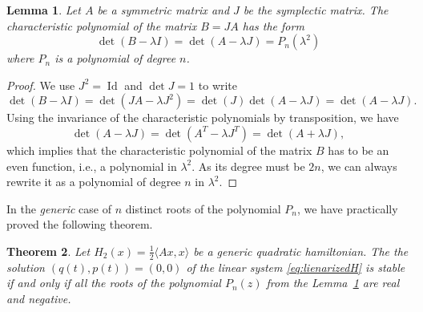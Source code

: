 \documentclass[english,fontsize=11pt,paper=b5]{scrbook}
\DeclareMathOperator{\Id}{Id}
\DeclareMathOperator{\Id}{Id}
\newtheorem{theorem}{Theorem}[chapter]
\newtheorem{lemma}[theorem]{Lemma}
\theoremstyle{definition}
\begin{document}
      \begin{lemma}\label{eq:lemmaCP}
        Let $A$ be a symmetric matrix and $J$ be the symplectic matrix.
        The characteristic polynomial of the matrix $B=JA$ has the form
        \begin{equation}
          \det(B-\lambda I) = \det(A-\lambda J) = P_n(\lambda^2)
        \end{equation}
        where $P_n$ is a polynomial of degree $n$.
      \end{lemma}
      \begin{proof}
        We use $J^2 = \Id$ and $\det J= 1$ to write
        \begin{equation}
          \det(B-\lambda I) = \det(JA - \lambda J^2) = \det(J) \det(A-\lambda J) = \det(A-\lambda J).
        \end{equation}
        Using the invariance of the characteristic polynomials by transposition, we have
        \begin{equation}
          \det(A-\lambda J) = \det(A^T -\lambda J^T) = \det(A + \lambda J),
        \end{equation}
        which implies that the characteristic polynomial of the matrix $B$ has to be an even function, i.e., a polynomial in $\lambda^2$.
        As its degree must be $2n$, we can always rewrite it as a polynomial of degree $n$ in $\lambda^2$.
      \end{proof}

      In the \emph{generic} case of $n$ distinct roots of the polynomial $P_n$, we have practically proved the following theorem.

      \begin{theorem}
        Let $H_2(x) = \frac12\langle Ax,x\rangle$ be a generic quadratic hamiltonian. The the solution $(q(t), p(t)) = (0,0)$ of the linear system \eqref{eq:lienarizedH} is stable if and only if all the roots of the polynomial $P_n(z)$ from the Lemma~\ref{eq:lemmaCP} are real and negative.
      \end{theorem}
\end{document}
